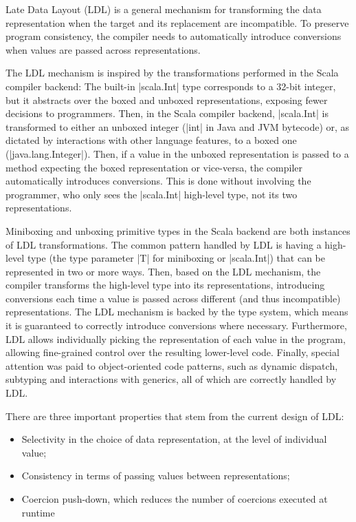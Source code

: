 Late Data Layout (LDL) is a general mechanism for transforming the data representation when the target and its replacement are incompatible. To preserve program consistency, the compiler needs to automatically introduce conversions when values are passed across representations.

The LDL mechanism is inspired by the transformations performed in the Scala compiler backend: The built-in |scala.Int| type corresponds to a 32-bit integer, but it abstracts over the boxed and unboxed representations, exposing fewer decisions to programmers. Then, in the Scala compiler backend, |scala.Int| is transformed to either an unboxed integer (|int| in Java and JVM bytecode) or, as dictated by interactions with other language features, to a boxed one (|java.lang.Integer|). Then, if a value in the unboxed representation is passed to a method expecting the boxed representation or vice-versa, the compiler automatically introduces conversions. This is done without involving the programmer, who only sees the |scala.Int| high-level type, not its two representations.

Miniboxing and unboxing primitive types in the Scala backend are both instances of LDL transformations. The common pattern handled by LDL is having a high-level type (the type parameter |T| for miniboxing or |scala.Int|) that can be represented in two or more ways. Then, based on the LDL mechanism, the compiler transforms the high-level type into its representations, introducing conversions each time a value is passed across different (and thus incompatible) representations. The LDL mechanism is backed by the type system, which means it is guaranteed to correctly introduce conversions where necessary. Furthermore, LDL allows individually picking the representation of each value in the program, allowing fine-grained control over the resulting lower-level code. Finally, special attention was paid to object-oriented code patterns, such as dynamic dispatch, subtyping and interactions with generics, all of which are correctly handled by LDL.

There are three important properties that stem from the current design of LDL:

\begin{itemize}
  \item Selectivity in the choice of data representation, at the level of individual value;
  \item Consistency in terms of passing values between representations; %
  \item Coercion push-down, which reduces the number of coercions executed at runtime
\end{itemize}

